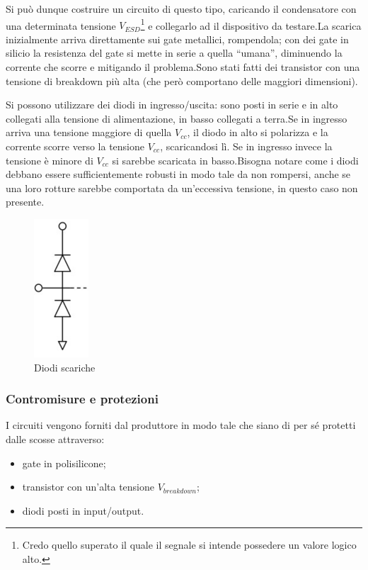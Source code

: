 \documentclass[
]{book}
\providecommand{\tightlist}{%
  \setlength{\itemsep}{0pt}\setlength{\parskip}{0pt}}
\begin{document}
Si può dunque costruire un circuito di questo tipo, caricando il
condensatore con una determinata tensione \(V_{ESD}\)\footnote{Credo
  quello superato il quale il segnale si intende possedere un valore
  logico alto.} e collegarlo ad il dispositivo da testare.\newline La
scarica inizialmente arriva direttamente sui gate metallici, rompendola;
con dei gate in silicio la resistenza del gate si mette in serie a
quella ``umana'', diminuendo la corrente che scorre e mitigando il
problema.\newline Sono stati fatti dei transistor con una tensione di
breakdown più alta (che però comportano delle maggiori dimensioni).

Si possono utilizzare dei diodi in ingresso/uscita: sono posti in serie
e in alto collegati alla tensione di alimentazione, in basso collegati a
terra.\newline Se in ingresso arriva una tensione maggiore di quella
\(V_{cc}\), il diodo in alto si polarizza e la corrente scorre verso la
tensione \(V_{cc}\), scaricandosi lì. Se in ingresso invece la tensione
è minore di \(V_{cc}\) si sarebbe scaricata in basso.\newline Bisogna
notare come i diodi debbano essere sufficientemente robusti in modo tale
da non rompersi, anche se una loro rotture sarebbe comportata da
un'eccessiva tensione, in questo caso non presente.

\begin{figure}
\centering
\includegraphics[width=0.1\linewidth,height=\textheight,keepaspectratio]{assets/imgs/diodi_scariche.png}
\caption{Diodi scariche}
\end{figure}

\subsubsection{Contromisure e
protezioni}\label{contromisure-e-protezioni}

I circuiti vengono forniti dal produttore in modo tale che siano di per
sé protetti dalle scosse attraverso:

\begin{itemize}
\tightlist
\item
  gate in polisilicone;
\item
  transistor con un'alta tensione \(V_{breakdown}\);
\item
  diodi posti in input/output.
\end{itemize}
\end{document}
